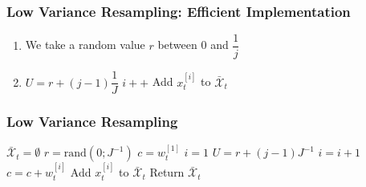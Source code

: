 \begin{frame} 
    \frametitle{Low Variance Resampling: Efficient Implementation} 
    
    \begin{center} 
    \end{center} 
    
    \begin{enumerate} 
        \item<1-> We take a random value $r$ between 0 and $\dfrac{1}{j}$ 
        \item<2> 
        \begin{algorithmic}[1] 
            \State $U = r + (j - 1) \dfrac{1}{J}$ 
            \State $i++$ 
            \EndWhile 
            \State Add $x_t^{[i]}$ to $\bar{\mathcal{X}}_t$ 
            \EndFor 
        \end{algorithmic} 
    \end{enumerate}
    
\end{frame}


\begin{frame}
    \frametitle{Low Variance Resampling}
    \begin{algorithmic}[1]
        \State $\bar{\mathcal{X}}_t = \emptyset$
        \State $r = \text{rand}(0; J^{-1})$
        \State $c = w_t^{[1]}$
        \State $i = 1$
            \State $U = r + (j - 1) J^{-1}$
                \State $i = i + 1$
                \State $c = c + w_t^{[i]}$
            \EndWhile
            \State Add $x_t^{[i]}$ to $\bar{\mathcal{X}}_t$
        \EndFor
        \State Return $\bar{\mathcal{X}}_t$
        \EndProcedure
    \end{algorithmic}
\end{frame}

